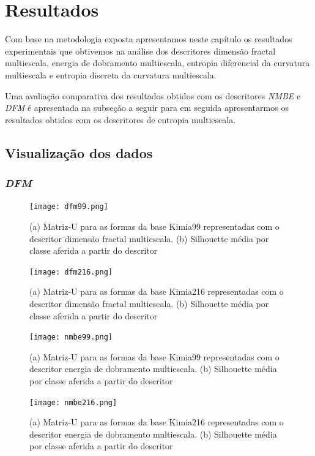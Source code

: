 \chapter{Resultados}


Com base na metodologia exposta apresentamos neste capítulo os resultados experimentais que obtivemos na análise dos descritores dimensão fractal multiescala, energia de dobramento multiescala, entropia diferencial da curvatura multiescala e entropia discreta da curvatura multiescala.

Uma avaliação comparativa dos resultados obtidos com os descritores \emph{NMBE} e \emph{DFM} é apresentada na subseção a seguir para em seguida apresentarmos os resultados obtidos com os descritores de entropia multiescala.

\section{Visualização dos dados}

\subsection{\emph{DFM}}

\begin{figure}
 \caption{\label{fig:dfm99} (a) Matriz-U para as formas da base Kimia99 representadas com o descritor dimensão fractal multiescala. (b) Silhouette média por classe aferida a partir do descritor}
  \centering
  \texttt{[image: dfm99.png]}
\end{figure}

\begin{figure}
 \caption{\label{fig:dfm216} (a) Matriz-U para as formas da base Kimia216 representadas com o descritor dimensão fractal multiescala. (b) Silhouette média por classe aferida a partir do descritor}
  \centering
  \texttt{[image: dfm216.png]}
\end{figure}

\begin{figure}
 \caption{\label{fig:nmbe99} (a) Matriz-U para as formas da base Kimia99 representadas com o descritor energia de dobramento multiescala. (b) Silhouette média por classe aferida a partir do descritor}
  \centering
  \texttt{[image: nmbe99.png]}
\end{figure}

\begin{figure}
 \caption{\label{fig:nmbe216} (a) Matriz-U para as formas da base Kimia216 representadas com o descritor energia de dobramento multiescala. (b) Silhouette média por classe aferida a partir do descritor}
  \centering
  \texttt{[image: nmbe216.png]}
\end{figure}


